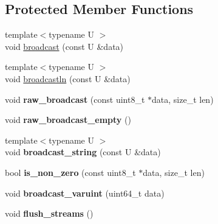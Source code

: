 \subsection*{Protected Member Functions}
\begin{DoxyCompactItemize}
\item 
{\footnotesize template$<$typename U $>$ }\\void \mbox{\hyperlink{classathome_1_1module_1_1_at_home_module_a22f6afbe9594849ecccae5b9f4dfe47d}{broadcast}} (const U \&data)
\item 
{\footnotesize template$<$typename U $>$ }\\void \mbox{\hyperlink{classathome_1_1module_1_1_at_home_module_a863a9efaa6d10169d1888278cbc70175}{broadcastln}} (const U \&data)
\item 
\mbox{\label{classathome_1_1module_1_1_at_home_module_a7d22f6479f95f5dfa1dcbec9c67e3d10}} 
void {\bfseries raw\+\_\+broadcast} (const uint8\+\_\+t $\ast$data, size\+\_\+t len)
\item 
\mbox{\label{classathome_1_1module_1_1_at_home_module_adc09c21d6a82b16e48d5892d7272d890}} 
void {\bfseries raw\+\_\+broadcast\+\_\+empty} ()
\item 
\mbox{\label{classathome_1_1module_1_1_at_home_module_a42a38b4ff497dd6c970b2f3a1e05b705}} 
{\footnotesize template$<$typename U $>$ }\\void {\bfseries broadcast\+\_\+string} (const U \&data)
\item 
\mbox{\label{classathome_1_1module_1_1_at_home_module_aa59cdbf90894bdd1328142bb6639b3fd}} 
bool {\bfseries is\+\_\+non\+\_\+zero} (const uint8\+\_\+t $\ast$data, size\+\_\+t len)
\item 
\mbox{\label{classathome_1_1module_1_1_at_home_module_a71ea0b59b8da46ad42409e511435bdcb}} 
void {\bfseries broadcast\+\_\+varuint} (uint64\+\_\+t data)
\item 
\mbox{\label{classathome_1_1module_1_1_at_home_module_a07d39ba826e916f33af4b48a2e8514c5}} 
void {\bfseries flush\+\_\+streams} ()

\end{DoxyCompactItemize}
